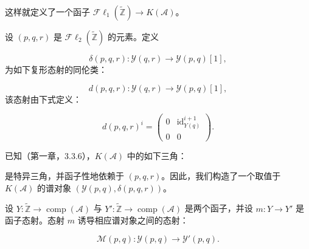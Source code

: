 \clearpage
{}%
\begingroup\small\setlength{\parskip}{0pt}\setlength{\emergencystretch}{1.5em}
\setlength{\abovedisplayskip}{4pt plus 2pt minus 2pt}%
\setlength{\belowdisplayskip}{4pt plus 2pt minus 2pt}%

这样就定义了一个函子
$\mathcal{F}\ell_1(\widetilde{\mathbb Z})\longrightarrow K(\mathcal A)$。

设 $(p,q,r)$ 是 $\mathcal{F}\ell_2(\widetilde{\mathbb Z})$ 的元素。定义

\begin{equation}
\delta(p,q,r)\colon\mathcal Y(q,r)\longrightarrow\mathcal Y(p,q)[1],
\tag{4.1.1.6}
\end{equation}
为如下复形态射的同伦类：

\begin{equation}
d(p,q,r)\colon\mathcal Y(q,r)\longrightarrow\mathcal Y(p,q)[1],
\tag{4.1.1.7}
\end{equation}
该态射由下式定义：

\begin{equation}
d(p,q,r)^i=
\begin{pmatrix}
0 & \operatorname{id}_{Y(q)}^{i+1}\\
0 & 0
\end{pmatrix}.
\tag{4.1.1.8}
\end{equation}

已知（第一章，3.3.6），$K(\mathcal A)$ 中的如下三角：

\begin{center}
\end{center}
是特异三角，并函子性地依赖于 $(p,q,r)$。因此，我们构造了一个取值于
$K(\mathcal A)$ 的谱对象 $(\mathcal Y(p,q),\delta(p,q,r))$。

设 $Y\colon\widetilde{\mathbb Z}\longrightarrow
\operatorname{comp}(\mathcal A)$ 与
$Y'\colon\widetilde{\mathbb Z}\longrightarrow
\operatorname{comp}(\mathcal A)$ 是两个函子，并设
$m\colon Y\longrightarrow Y'$ 是函子态射。态射 $m$ 诱导相应谱对象之间的态射：

\begin{equation}
\mathcal M(p,q)\colon\mathcal Y(p,q)\longrightarrow\mathcal Y'(p,q).
\tag{4.1.1.9}
\end{equation}

